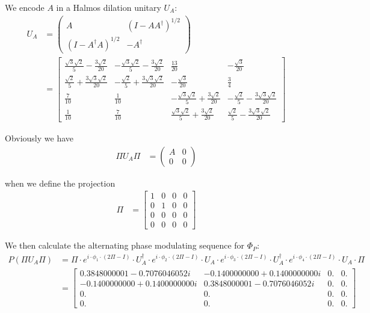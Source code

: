 \documentclass{article}
\begin{document}
\noindent We encode $A$ in a Halmos dilation unitary  $U_A$:
\begin{align*}
    U_A & = \begin{pmatrix} A & (I - AA^{\dagger})^{1/2} \\ (I - A^{\dagger}A)^{1/2} & -A^{\dagger} \end{pmatrix}\\
& =
\begin{bmatrix}
\frac{\sqrt{3}\sqrt{2}}{5} - \frac{3\sqrt{2}}{20} & -\frac{\sqrt{3}\sqrt{2}}{5} - \frac{3\sqrt{2}}{20} & \frac{13}{20} & -\frac{\sqrt{3}}{20} \\
\frac{\sqrt{2}}{5} + \frac{3\sqrt{3}\sqrt{2}}{20} & -\frac{\sqrt{2}}{5} + \frac{3\sqrt{3}\sqrt{2}}{20} & -\frac{\sqrt{3}}{20} & \frac{3}{4} \\
\frac{7}{10} & \frac{1}{10} & -\frac{\sqrt{3}\sqrt{2}}{5} + \frac{3\sqrt{2}}{20} & -\frac{\sqrt{2}}{5} - \frac{3\sqrt{3}\sqrt{2}}{20} \\
\frac{1}{10} & \frac{7}{10} & \frac{\sqrt{3}\sqrt{2}}{5} + \frac{3\sqrt{2}}{20} & \frac{\sqrt{2}}{5} - \frac{3\sqrt{3}\sqrt{2}}{20}
\end{bmatrix}
\end{align*}

\noindent Obviously we have 
\begin{align*}
	\Pi U_A \Pi & = \begin{pmatrix} A & 0 \\ 0 & 0 \end{pmatrix}
\end{align*}

\noindent when we define the projection
\begin{align*}
    \Pi &= \begin{bmatrix} 1 & 0 & 0 & 0 \\ 0 & 1 & 0 & 0 \\ 0 & 0 & 0 & 0 \\ 0 & 0 & 0 & 0 \end{bmatrix} 
\end{align*}

\noindent We then calculate the alternating phase modulating sequence for $\Phi_P$:
\begin{align*}
 P(\Pi U_A \Pi) & =  \Pi \cdot e^{i\cdot\phi_1\cdot(2\Pi - I)} \cdot U_A^{\dagger} \cdot e^{i\cdot\phi_2\cdot(2\Pi - I)} \cdot U_A \cdot e^{i\cdot\phi_3\cdot(2\Pi - I)} \cdot U_A^{\dagger} \cdot e^{i\cdot\phi_4\cdot(2\Pi - I)} \cdot U_A \cdot \Pi \\
 & = \begin{bmatrix}
0.3848000001 - 0.7076046052i & -0.1400000000 + 0.1400000000i & 0. & 0. \\
-0.1400000000 + 0.1400000000i & 0.3848000001 - 0.7076046052i & 0. & 0. \\
0. & 0. & 0. & 0. \\
0. & 0. & 0. & 0.
\end{bmatrix}
\end{align*}
\end{document}
